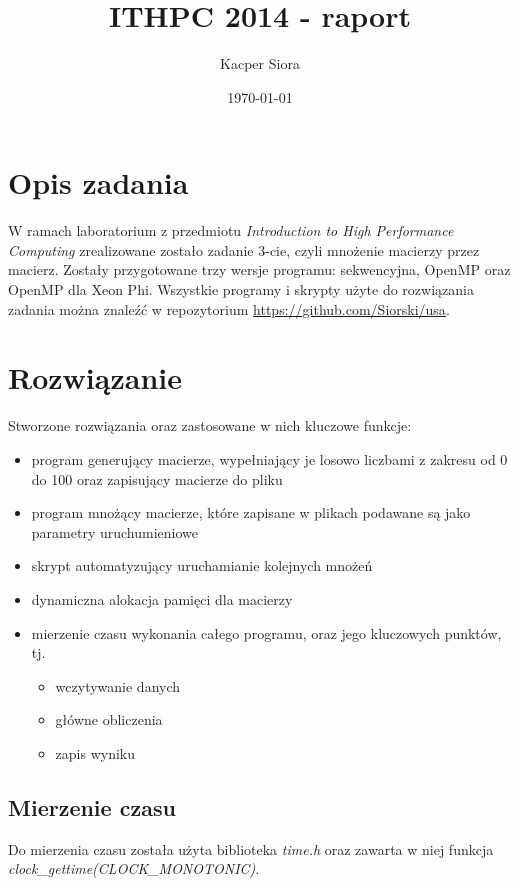 \documentclass[a4paper]{article}
\title{ITHPC 2014 - raport}
\author{Kacper Siora}
\date{\today}
\begin{document}
\maketitle

\section{Opis zadania}
W ramach laboratorium z przedmiotu \textit{Introduction to High Performance Computing} zrealizowane zostało zadanie 3-cie, czyli mnożenie macierzy przez macierz. Zostały przygotowane trzy wersje programu: sekwencyjna, OpenMP oraz OpenMP dla Xeon Phi. Wszystkie programy i skrypty użyte do rozwiązania zadania można znaleźć w repozytorium \url{https://github.com/Siorski/usa}.

\section{Rozwiązanie}
Stworzone rozwiązania oraz zastosowane w nich kluczowe funkcje:
\begin{itemize}
\item program generujący macierze, wypełniający je losowo liczbami z zakresu od 0 do 100 oraz zapisujący macierze do pliku
\item program mnożący macierze, które zapisane w plikach podawane są jako parametry uruchumieniowe
\item skrypt automatyzujący uruchamianie kolejnych mnożeń
\item dynamiczna alokacja pamięci dla macierzy
\item mierzenie czasu wykonania całego programu, oraz jego kluczowych punktów, tj.  
  \begin{itemize}
  \item wczytywanie danych
  \item główne obliczenia
  \item zapis wyniku
  \end{itemize}
\end{itemize}

\subsection{Mierzenie czasu}
Do mierzenia czasu została użyta biblioteka \textit{time.h} oraz zawarta w niej funkcja \textit{clock\_gettime(CLOCK\_MONOTONIC)}.

\newpage
\end{document}
